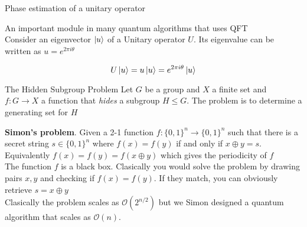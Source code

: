 \documentclass[aspectratio=1610]{beamer}					%
\begin{document}
\begin{frame}{Phase estimation of a unitary operator}

An important module in many quantum algorithms that uses QFT\\
\vspace{0.1in}
Consider an eigenvector $\ket{u}$ of a Unitary operator $U$. Its eigenvalue can be written as $u = e^{2\pi i\theta}$

\begin{equation*}
U\ket{u} = u\ket{u} = e^{2\pi i\theta}\ket{u}
\end{equation*}

\end{frame}

\begin{frame}{The Hidden Subgroup Problem}
Let $G$ be a group and $X$ a finite set and $f:G\rightarrow X$ a function that \emph{hides} a subgroup $H\leq G$. The problem is to determine a generating set for $H$\\
\vspace{0.2in}

\textbf{Simon's problem}. Given a 2-1 function $f:\{0,1\}^{n}\rightarrow \{0,1\}^{n}$ such that there is a secret string $s\in\{0,1\}^{n}$ where $f(x) = f(y)$ if and only if $x\oplus y = s$. Equivalently $f(x) = f(y) = f(x\oplus y)$ which gives the periodicity of $f$\\
\vspace{0.2in}
The function $f$ is a black box. Clasically you would solve the problem by drawing pairs $x,y$ and checking if $f(x) = f(y)$. If they match, you can obviously retrieve $s = x\oplus y$\\
\vspace{0.2in}
Clasically the problem scales as $\mathcal{O}(2^{n/2})$ but we Simon designed a quantum algorithm that scales as $\mathcal{O}(n)$.

\end{frame}
\end{document}
